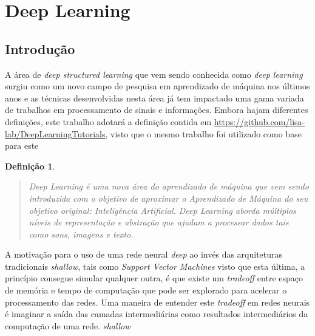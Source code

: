 
\section{Deep Learning}

\subsection{Introdução}

A área de \emph{deep structured learning} que vem sendo conhecida como
\emph{deep learning} surgiu como um novo campo de pesquisa em aprendizado de
máquina nos últimos anos e as técnicas desenvolvidas nesta área já tem
impactado uma gama variada de trabalhos em processamento de sinais e
informações. Embora hajam diferentes definições, este trabalho adotará a
definição contida em \url{https://github.com/lisa-lab/DeepLearningTutorials},
visto que o mesmo trabalho foi utilizado como base para este\cite{deng2014deep}

\newtheorem{def-deep-learning}{Definição}

\begin{def-deep-learning}

  \begin{quote}

    \emph{Deep Learning} é uma nova área do aprendizado de máquina que vem
    sendo introduzida com o objetivo de aproximar o Aprendizado de Máquina do
    seu objetivo original: Inteligência Artificial. \emph{Deep Learning} aborda
    múltiplos níveis de representação e abstração que ajudam a processar dados
    tais como sons, imagens e texto.

  \end{quote}

\end{def-deep-learning}

A motivação para o uso de uma rede neural \emph{deep} ao invés das arquiteturas
tradicionais \emph{shallow}, tais como \emph{Support Vector Machines} visto que
esta última, a princípio consegue simular qualquer outra, é que existe um
\emph{tradeoff} entre espaço de memória e tempo de computação que pode ser
explorado para acelerar o processamento das redes. Uma maneira de entender este
\emph{tradeoff} em redes neurais é imaginar a saída das camadas intermediárias
como resultados intermediários da computação de uma rede.
\emph{shallow}\cite{bengio2007scalling} 

